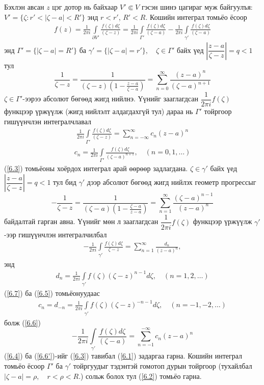 \begin{prf}
Бэхлэн авсан $z$ цэг дотор нь байхаар $V'\Subset V$ гэсэн шинэ цагираг муж байгуулъя: $V'=\{\zeta :r'<|\zeta-a|<R'\}$ энд $r<r'$, $R'<R$. Кошийн интеграл томьёо ёсоор
\begin{eqnarray} \label{6.3}
     f(z)=\frac{1}{2\pi i} \int\limits_{\partial V'} \frac{f(\zeta)d\zeta}{(\zeta -z)}= \frac{1}{2\pi i} \int\limits_{\Gamma'} \frac{f(\zeta)d\zeta}{(\zeta -a)}-\frac{1}{2\pi i} \int\limits_{\gamma'} \frac{f(\zeta)d\zeta}{(\zeta -a)}
\end{eqnarray}
энд $\Gamma '=\{|\zeta -a|=R'\}$ ба $\gamma '=\{|\zeta -a|=r'\}, \quad \zeta\in \Gamma '$ байх үед $\left|\dfrac{z-a}{\zeta -z}\right|=q<1$ тул 
$$\frac{1}{\zeta-z}=\frac{1}{(\zeta -z)\left(1-\frac{z-a}{\zeta -a}\right)}=\sum\limits_{n=0}^\infty \frac{(z-a)^n}{(\zeta -a)^{n+1}}$$
$\zeta \in \Gamma'$-ээрээ абсолют бөгөөд жигд нийлнэ. Үүнийг зааглагдсан $\dfrac{1}{2\pi i}f(\zeta)$ функцээр үржүүлж (жигд нийлэлт алдагдахгүй тул) дараа нь $\Gamma '$ тойргоор гишүүнчлэн интегралчлавал
\begin{eqnarray} \label{6.4}
    \frac{1}{2\pi i}\int\limits_{\Gamma'} \frac{f(\zeta)d\zeta}{(\zeta -z)}= \sum\limits_{n=-\infty}^\infty c_n(z-a)^n
\end{eqnarray}
\begin{eqnarray} \label{6.5}
    c_n=\frac{1}{2\pi i}\int\limits_{\Gamma'} \frac{f(\zeta)d\zeta}{(\zeta -a)^{n+1}}, \quad (n=0,1,\ldots)
\end{eqnarray}
(\ref{6.3}) томьёоны хоёрдох интеграл арай өөрөөр задлагдана. $\zeta \in \gamma'$ байх үед $\left|\dfrac{z-a}{\zeta -z}\right| =q<1$ тул бид $\gamma'$ дээр абсолют бөгөөд жигд нийлэх геометр прогрессыг 
$$-\frac{1}{\zeta -z}=\frac{1}{(\zeta -a)\left(1-\frac{\zeta -a}{z-a}\right)}=\sum\limits_{n=1}^\infty \frac{(\zeta-a)^{n-1}}{(z -a)^{n}}$$
байдалтай гарган авна. Үүнийг мөн л зааглагдсан $\dfrac{1}{2\pi i}f(\zeta)$
функцээр үржүүлж $\gamma '$-ээр гишүүнчлэн интегралчилбал
\begin{eqnarray} \label{6.6}
    -\frac{1}{2\pi i}\int\limits_{\gamma'} \frac{f(\zeta) d\zeta}{\zeta -z}=\sum\limits_{n=1}^\infty \frac{d_n}{(z-a)^n},
\end{eqnarray}
энд 
\begin{eqnarray} \label{6.7}
    d_n= \frac{1}{2\pi i}\int\limits_{\gamma'} f(\zeta)(\zeta -z)^{n-1}d\zeta, \quad (n=1,2,\ldots)
\end{eqnarray}
(\ref{6.7}) ба (\ref{6.5}) томьёонуудаас
\begin{eqnarray}
    c_n=d_{-n}= \frac{1}{2\pi i}\int\limits_{\gamma'} f(\zeta)(\zeta -z)^{-n-1}d\zeta, \quad (n=-1,-2, \ldots)
\end{eqnarray}
болж (\ref{6.6})
\begin{equation}
    \tag{6.6'} \label{6.6'}
    -\frac{1}{2\pi i}\int\limits_{\gamma'} \frac{f(\zeta)d\zeta}{(\zeta -a)}=\sum\limits_{n=-1}^{-\infty} c_n(z-a)^n
\end{equation}
(\ref{6.4}) ба (\ref{6.6'})-ийг (\ref{6.3}) тавибал (\ref{6.1}) задаргаа гарна. Кошийн интеграл томьёо ёсоор $\Gamma'$ ба $\gamma '$ тойргуудыг тэдэнтэй гомотоп дурын тойргоор (тухайлбал $|\zeta -a|=\rho, \quad r<\rho <R$.) сольж болох тул (\ref{6.2}) томьёо гарна.
 \end{prf}
